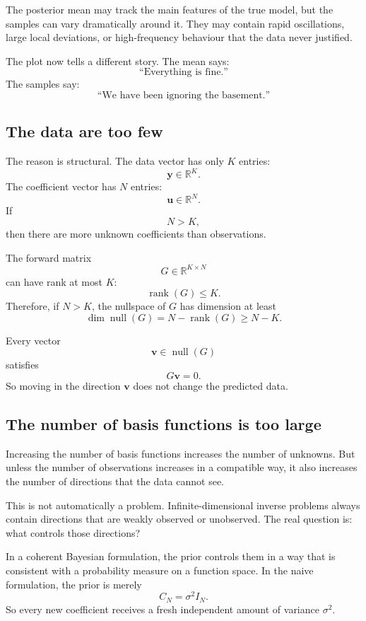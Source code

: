 \documentclass[11pt,a4paper]{book}
\begin{document}
The posterior mean may track the main features of the true model, but the
samples can vary dramatically around it. They may contain rapid oscillations,
large local deviations, or high-frequency behaviour that the data never
justified.

The plot now tells a different story. The mean says:
\[
    \text{``Everything is fine.''}
\]
The samples say:
\[
    \text{``We have been ignoring the basement.''}
\]

\subsection{The data are too few}

The reason is structural. The data vector has only $K$ entries:
\[
    \bm{y} \in \mathbb{R}^K.
\]
The coefficient vector has $N$ entries:
\[
    \bm{u} \in \mathbb{R}^N.
\]
If
\[
    N > K,
\]
then there are more unknown coefficients than observations.

The forward matrix
\[
    G \in \mathbb{R}^{K\times N}
\]
can have rank at most $K$:
\[
    \operatorname{rank}(G) \leq K.
\]
Therefore, if $N>K$, the nullspace of $G$ has dimension at least
\[
    \dim \operatorname{null}(G)
    =
    N-\operatorname{rank}(G)
    \geq
    N-K.
\]

Every vector
\[
    \bm{v} \in \operatorname{null}(G)
\]
satisfies
\[
    G\bm{v} = 0.
\]
So moving in the direction $\bm{v}$ does not change the predicted data.

\subsection{The number of basis functions is too large}

Increasing the number of basis functions increases the number of unknowns. But
unless the number of observations increases in a compatible way, it also
increases the number of directions that the data cannot see.

This is not automatically a problem. Infinite-dimensional inverse problems
always contain directions that are weakly observed or unobserved. The real
question is: what controls those directions?

In a coherent Bayesian formulation, the prior controls them in a way that is
consistent with a probability measure on a function space. In the naive
formulation, the prior is merely
\[
    C_N = \sigma^2 I_N.
\]
So every new coefficient receives a fresh independent amount of variance
$\sigma^2$.
\end{document}
